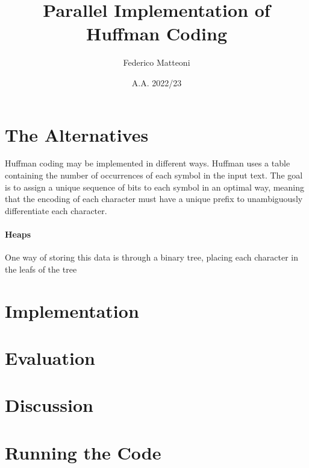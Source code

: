 \documentclass[10pt]{article}
\begin{document}
\title{Parallel Implementation of Huffman Coding}
\author{Federico Matteoni}
\date{A.A. 2022/23}
\maketitle

\section{The Alternatives}
Huffman coding may be implemented in different ways. Huffman uses a table containing the number of occurrences of each symbol in the input text. The goal is to assign a unique sequence of bits to each symbol in an optimal way, meaning that the encoding of each character must have a unique prefix to unambiguously differentiate each character.
\paragraph{}
\paragraph{Heaps} One way of storing this data is through a binary tree, placing each character in the leafs of the tree
\section{Implementation}
\section{Evaluation}
\section{Discussion}
\section{Running the Code} 
\end{document}
